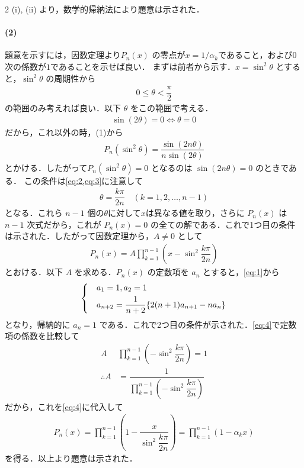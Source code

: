 \documentclass[../../main.tex]{subfiles}
\begin{document}
\begin{multicols}{2}
  (i), (ii) より，数学的帰納法により題意は示された．

  \paragraph{(2)}

  題意を示すには，因数定理より$P_n(x)$ の零点が$x=1/\alpha_{k}$であること，および$0$次の係数が$1$であることを示せば良い．
  まずは前者から示す．$x=\sin^2\theta$ とすると，$\sin^2\theta$ の周期性から
  \begin{align}\label{eq:2}
    0 \le \theta < \dfrac{\pi}{2}
  \end{align}
  の範囲のみ考えれば良い．以下 $\theta$ をこの範囲で考える．
  \begin{align}\label{eq:3}
    \sin(2\theta) = 0 \Leftrightarrow \theta = 0
  \end{align}
  だから，これ以外の時，(1)から
  \begin{align}
    P_n(\sin^2\theta) = \dfrac{\sin(2n\theta)}{n\sin(2\theta)}
  \end{align}
  とかける．したがって$P_n(\sin^2\theta)=0$ となるのは $\sin(2n\theta)=0$ のときである．
  この条件は\cref{eq:2,eq:3}に注意して
  \begin{align}
    \theta = \dfrac{k\pi}{2n} \quad (k=1, 2, \dots, n-1)
  \end{align}
  となる．これら $n-1$ 個の$\theta$に対して$x$は異なる値を取り，さらに $P_n(x)$ は $n-1$ 次式だから，これが $P_n(x)=0$ の全ての解である．これで1つ目の条件は示された．したがって因数定理から，$A\ne 0$ として
  \begin{align}\label{eq:4}
    P_n(x) = A \prod_{k=1}^{n-1} \left(x - \sin^2\dfrac{k\pi}{2n}\right)
  \end{align}
  とおける．以下 $A$ を求める．$P_n(x)$ の定数項を $a_n$ とすると，\cref{eq:1}から
  \begin{align}
    \begin{dcases}
      & a_1=1, a_2=1                                    \\
      & a_{n+2} = \dfrac{1}{n+2}\{2(n+1)a_{n+1} - na_n\}
    \end{dcases}
  \end{align}
  となり，帰納的に $a_n=1$ である．これで2つ目の条件が示された．\cref{eq:4}で定数項の係数を比較して
  \begin{align}
    A            & \prod_{k=1}^{n-1} \left(-\sin^2\dfrac{k\pi}{2n}\right) = 1         \\
    \therefore A & = \dfrac{1}{\prod_{k=1}^{n-1} \left(-\sin^2\dfrac{k\pi}{2n}\right)}
  \end{align}
  だから，これを\cref{eq:4}に代入して
  \begin{align}
    P_n(x) = \prod_{k=1}^{n-1} \left(1 - \dfrac{x}{\sin^2\dfrac{k\pi}{2n}}\right) = \prod_{k=1}^{n-1} (1-\alpha_k x)
  \end{align}
  を得る．以上より題意は示された．


\end{multicols}
\end{document}
